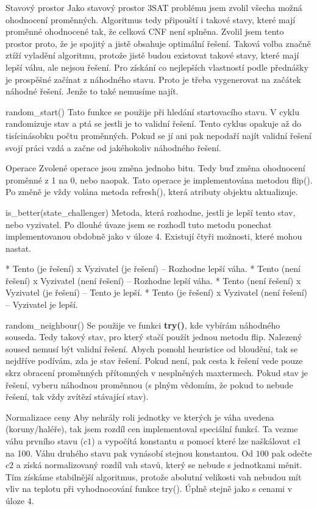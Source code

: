 \secc Stavový prostor
Jako stavový prostor 3SAT problému jsem zvolil všecha možná ohodnocení proměnných. Algoritmus tedy připouští i takové stavy, které mají proměnné ohodnocené tak, že celková CNF není splněna. Zvolil jsem tento prostor proto, že je spojitý a jistě obsahuje optimální řešení. Taková volba značně ztíží vyladění algoritmu, protože jistě budou existovat takové stavy, které mají lepší váhu, ale nejsou řešení. Pro získání co nejlepších vlastností podle přednášky je prospěšné začínat z náhodného stavu. Proto je třeba vygenerovat na začátek náhodné řešení. Jenže to také nemusíme najít.

\secc random\_start()
Tato funkce se použije při hledání startovacího stavu. V cyklu randomizuje stav a ptá se jestli je to validní řešení. Tento cyklus opakuje až do tisícinásobku počtu proměnných. Pokud se jí ani pak nepodaří najít validní řešení svojí práci vzdá a začne od jakéhokoliv náhodného řešení.

\secc Operace
Zvolené operace jsou změna jednoho bitu. Tedy buď změna ohodnocení proměnné z 1 na 0, nebo naopak. Tato operace je implementována metodou flip(). Po změně je vždy volána metoda refresh(), která atributy objektu aktualizuje.

\sec is\_better(state\_challenger)
Metoda, která rozhodne, jestli je lepší tento stav, nebo vyzivatel. Po dlouhé úvaze jsem se rozhodl tuto metodu ponechat implementovanou obdobně jako v úloze 4. Existují čtyři možnosti, které mohou nastat.

\begitems
* Tento (je řešení) x Vyzivatel (je řešení) -- Rozhodne lepší váha.
* Tento (není řešení) x Vyzivatel (není řešení) -- Rozhodne lepší váha.
* Tento (není řešení) x Vyzivatel (je řešení) -- Tento je lepší.
* Tento (je řešení) x Vyzivatel (není řešení) -- Vyzivatel je lepší.
\enditems

\secc random\_neighbour()
Se použije ve funkci {\bf try()}, kde vybírám náhodného souseda. Tedy takový stav, pro který stačí použít jednou metodu flip. Nalezený soused nemusí být validní řešení. Abych pomohl heuristice od   bloudění, tak se nejdříve podívám, zda je stav řešení. Pokud není, pak cesta k řešení vede pouze skrz obracení proměnných přítomných v nesplněných maxtermech. Pokud stav je řešení, vyberu náhodnou proměnnou (s plným vědomím, že pokud to nebude řešení, tak vždy zvítězí stávající stav).

\secc Normalizace ceny
Aby nehrály roli jednotky ve kterých je váha uvedena (koruny/haléře), tak jsem rozdíl cen implementoval speciální funkcí. Ta vezme váhu prvního stavu ($c1$) a vypočítá konstantu $a$ pomocí které lze naškálovat $c1$ na 100. Váhu druhého stavu pak vynásobí stejnou konstantou. Od $100$ pak odečte $c2$ a získá normalizovaný rozdíl vah stavů, který se nebude s jednotkami měnit. Tím získáme stabilnější algoritmus, protože abolutní velikosti vah nebudou mít vliv na teplotu při vyhodnocování funkce try(). Úplně stejně jako s cenami v úloze 4.


